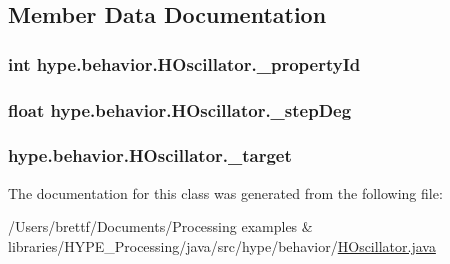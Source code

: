 \subsection{Member Data Documentation}
\hypertarget{classhype_1_1behavior_1_1_h_oscillator_a0f5690e41080e6de41ca6e36379a9f9f}{
\subsubsection[{\-\_\-property\-Id}]{\setlength{\rightskip}{0pt plus 5cm}int hype.\-behavior.\-H\-Oscillator.\-\_\-property\-Id\hspace{0.3cm}{\ttfamily [protected]}}}\label{classhype_1_1behavior_1_1_h_oscillator_a0f5690e41080e6de41ca6e36379a9f9f}
\hypertarget{classhype_1_1behavior_1_1_h_oscillator_acecd0b2ab56531647aa02f4347a2fa3d}{
\subsubsection[{\-\_\-step\-Deg}]{\setlength{\rightskip}{0pt plus 5cm}float hype.\-behavior.\-H\-Oscillator.\-\_\-step\-Deg\hspace{0.3cm}{\ttfamily [protected]}}}\label{classhype_1_1behavior_1_1_h_oscillator_acecd0b2ab56531647aa02f4347a2fa3d}
\hypertarget{classhype_1_1behavior_1_1_h_oscillator_af0894f7446ea5ec658c4c472d4436ef5}{
\subsubsection[{\-\_\-target}]{ hype.\-behavior.\-H\-Oscillator.\-\_\-target\hspace{0.3cm}{\ttfamily [protected]}}}\label{classhype_1_1behavior_1_1_h_oscillator_af0894f7446ea5ec658c4c472d4436ef5}


The documentation for this class was generated from the following file\-:\begin{DoxyCompactItemize}
\item 
/\-Users/brettf/\-Documents/\-Processing examples \& libraries/\-H\-Y\-P\-E\-\_\-\-Processing/java/src/hype/behavior/\hyperlink{_h_oscillator_8java}{H\-Oscillator.\-java}\end{DoxyCompactItemize}
